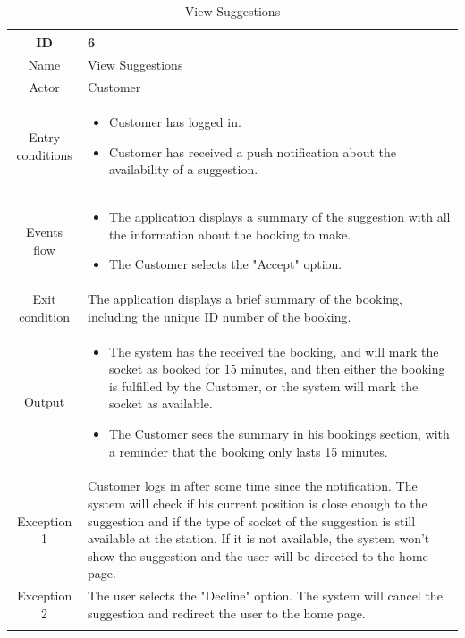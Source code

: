 \begin{longtable}{|c| p{10cm}|}
    \hline ID        & 6\\
    \hline
    Name     & View Suggestions \\
    \hline
    Actor            & Customer\\
    \hline
    Entry conditions & \begin{itemize}[nosep,after=\strut]
        \item Customer has logged in.
        \item Customer has received a push notification about the availability of a suggestion.
    \end{itemize}
        \\
    \hline
    Events flow      & \begin{itemize}[nosep,after=\strut]
        \item The application displays a summary of the suggestion with all the information about the booking to make.
        \item The Customer selects the "Accept" option.
    \end{itemize}\\
    \hline
    Exit condition   & The application displays a brief summary of the booking, including the unique ID number of the booking.\\
    \hline
    Output           & \begin{itemize}
        \item   The system has the received the booking, and will mark the socket as booked for 15 minutes, and then either the booking is fulfilled by the Customer, or the system will mark the socket as available.
        \item   The Customer sees the summary in his bookings section, with a reminder that the booking only lasts 15 minutes.
    \end{itemize}
    \\
    \hline
    \hline
    Exception 1      &  Customer logs in after some time since the notification. The system will check if his current position is close enough to the suggestion and if the type of socket of the suggestion is still available at the station.
    If it is not available, the system won't show the suggestion and the user will be directed to the home page.\\
    \hline
    Exception 2      &  The user selects the "Decline" option. The system will cancel the suggestion and redirect the user to the home page.\\
    \hline
    \caption{View Suggestions}\\
\end{longtable}
